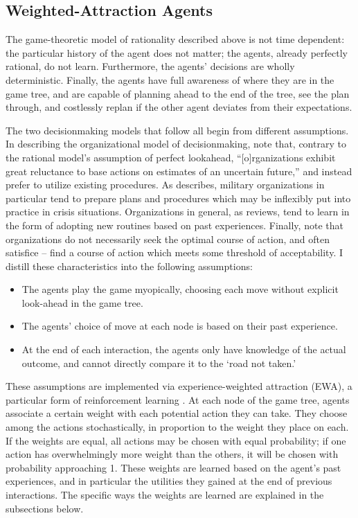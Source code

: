 \subsection{Weighted-Attraction Agents}\label{weighted-attraction-agents}

The game-theoretic model of rationality described above is not time dependent: the particular history of the agent does not matter; the agents, already perfectly rational, do not learn. Furthermore, the agents' decisions are wholly deterministic. Finally, the agents have full awareness of where they are in the game tree, and are capable of planning ahead to the end of the tree, see the plan through, and costlessly replan if the other agent deviates from their expectations.

The two decisionmaking models that follow all begin from different assumptions. In describing the organizational model of decisionmaking, \citet{allison_1999} note that, contrary to the rational model's assumption of perfect lookahead, ``[o]rganizations exhibit great reluctance to base actions on estimates of an uncertain future,'' and instead prefer to utilize existing procedures. As \citet{levy_1986} describes, military organizations in particular tend to prepare plans and procedures which may be inflexibly put into practice in crisis situations. Organizations in general, as \citet{lundberg_1995} reviews, tend to learn in the form of adopting new routines based on past experiences. Finally, \citet{march_1993} note that organizations do not necessarily seek the optimal course of action, and often satisfice -- find a course of action which meets some threshold of acceptability. I distill these characteristics into the following assumptions:

\begin{itemize}
 	\item The agents play the game myopically, choosing each move without explicit look-ahead in the game tree.
 	 \item The agents' choice of move at each node is based on their past experience.
 	 \item At the end of each interaction, the agents only have knowledge of the actual outcome, and cannot directly compare it to the `road not taken.' 
 \end{itemize}

These assumptions are implemented via experience-weighted attraction (EWA), a particular form of reinforcement learning \citep{sutton_1998,galla_2013}. At each node of the game tree, agents associate a certain weight with each potential action they can take. They choose among the actions stochastically, in proportion to the weight they place on each. If the weights are equal, all actions may be chosen with equal probability; if one action has overwhelmingly more weight than the others, it will be chosen with probability approaching 1. These weights are learned based on the agent's past experiences, and in particular the utilities they gained at the end of previous interactions. The specific ways the weights are learned are explained in the subsections below. 

